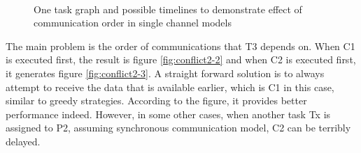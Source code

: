 \documentclass[msc,deptreport, cs]{infthesis}
\begin{document}
\begin{figure}[!htb]
  \centering
  \vspace{1em}
  \hspace{3em}
   \hspace{4em}
   \\
   \hspace{1em}
  \caption{One task graph and possible timelines to demonstrate effect of communication order in single channel models}
  \label{fig:conflict2}
\end{figure}

The main problem is the order of communications that T3 depends on. When C1 is executed first, the result is figure \ref{fig:conflict2-2} and when C2 is executed first, it generates figure \ref{fig:conflict2-3}. A straight forward solution is to always attempt to receive the data that is available earlier, which is C1 in this case, similar to greedy strategies. According to the figure, it provides better performance indeed. However, in some other cases, when another task Tx is assigned to P2, assuming synchronous communication model, C2 can be terribly delayed.
\end{document}
